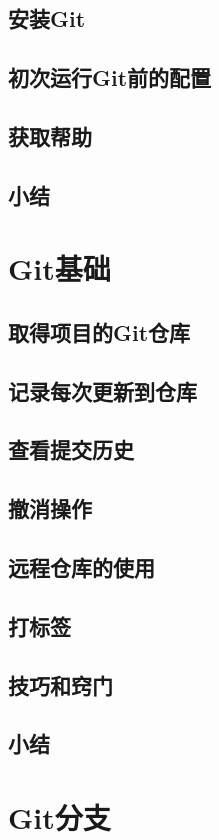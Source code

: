 \documentclass{book}
\begin{document}
	\section{安装Git}
	\section{初次运行Git前的配置}
	\section{获取帮助}
	\section{小结}

\chapter{Git基础}
	\section{取得项目的Git仓库}
	\section{记录每次更新到仓库}
	\section{查看提交历史}
	\section{撤消操作}
	\section{远程仓库的使用}
	\section{打标签}
	\section{技巧和窍门}
	\section{小结}

\chapter{Git分支}
\end{document}
